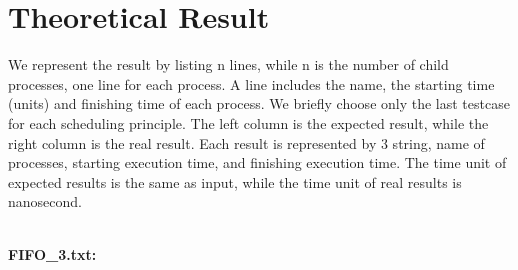 \documentclass{article}
\begin{document}
\section{Theoretical Result}
    We represent the result by listing n lines, while n is the number of child processes, one line for each process. A line includes the name, the starting time (units) and finishing time of each process. We briefly choose only the last testcase for each scheduling principle. The left column is the expected result, while the right column is the real result. Each result is represented by 3 string, name of processes, starting execution time, and finishing execution time. The time unit of expected results is the same as input, while the time unit of real results is nanosecond.\\\\
    
        \ttfamily

        {\noindent\bfseries FIFO\_3.txt:}
        \begin{parcolumns}[nofirstindent, colwidths={1=.2\linewidth}, rulebetween=true]{2}
        \end{parcolumns}
\end{document}
